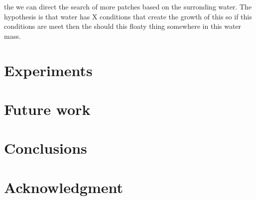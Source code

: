 \documentclass[conference]{IEEEtran}
\begin{document}
    the we can direct the search of more patches based on the surronding water.
    The hypothesis is that water has X conditions that create the growth of this so if this conditions
    are meet then the should this floaty thing somewhere in this water mass.


    \section{Experiments}


    \section{Future work}


    \section{Conclusions}

    \section*{Acknowledgment}

    
    
\end{document}
